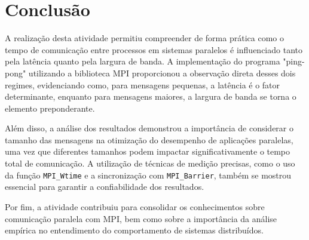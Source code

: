 \documentclass[a4paper, 12pt]{article}
\begin{document}
	\section{Conclusão}
	
	\hspace{0.62cm}A realização desta atividade permitiu compreender de forma prática como o tempo de comunicação entre processos em sistemas paralelos é influenciado tanto pela latência quanto pela largura de banda. A implementação do programa "ping-pong" utilizando a biblioteca MPI proporcionou a observação direta desses dois regimes, evidenciando como, para mensagens pequenas, a latência é o fator determinante, enquanto para mensagens maiores, a largura de banda se torna o elemento preponderante.
	
	\hspace{0.62cm}Além disso, a análise dos resultados demonstrou a importância de considerar o tamanho das mensagens na otimização do desempenho de aplicações paralelas, uma vez que diferentes tamanhos podem impactar significativamente o tempo total de comunicação. A utilização de técnicas de medição precisas, como o uso da função \texttt{MPI\_Wtime} e a sincronização com \texttt{MPI\_Barrier}, também se mostrou essencial para garantir a confiabilidade dos resultados.
	
	\hspace{0.62cm}Por fim, a atividade contribuiu para consolidar os conhecimentos sobre comunicação paralela com MPI, bem como sobre a importância da análise empírica no entendimento do comportamento de sistemas distribuídos.
	
\end{document}
